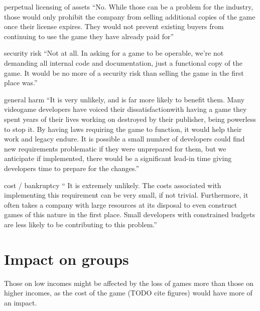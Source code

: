 perpetual licensing of assets
``No. While those can be a problem for the industry, those would only prohibit the company from selling additional copies of the game once their license expires.
They would not prevent existing buyers from continuing to use the game they have already paid for''

security risk
``Not at all.
In asking for a game to be operable, we're not demanding all internal code and documentation, just a functional copy of the game.
It would be no more of a security risk than selling the game in the first place was.''

general harm
``It is very unlikely, and is far more likely to benefit them.
Many videogame developers have voiced their dissatisfaction\cn with having a game they spent years of their lives working on destroyed by their publisher, being powerless to stop it.
By having laws requiring the game to function, it would help their work and legacy endure.
It is possible a small number of developers could find new requirements problematic if they were unprepared for them, but we anticipate if implemented, there would be a significant lead-in time giving developers time to prepare for the changes.''

cost / bankruptcy
`` It is extremely unlikely. The costs associated with implementing this requirement can be very small, if not trivial.\cn
Furthermore, it often takes a company with large resources at its disposal to even construct games of this nature in the first place.\cn
Small developers with constrained budgets are less likely to be contributing to this problem.''

\section{Impact on groups}


Those on low incomes might be affected by the loss of games more than those on higher incomes, as the cost of the game (TODO cite figures) would have more of an impact.
